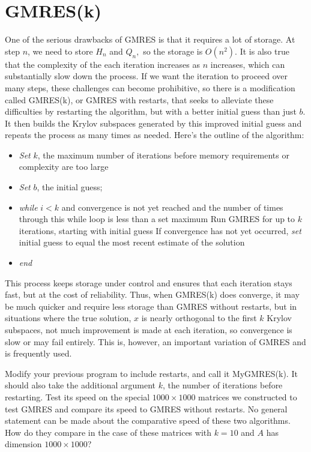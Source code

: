 \section*{GMRES(k)}
One of the serious drawbacks of GMRES is that it requires a lot of storage.
At step $n$, we need to store $H_n$ and $Q_n,$ so the storage is $O(n^2).$
It is also true that the complexity of the each iteration increases as $n$ increases, which can substantially slow down the process.
If we want the iteration to proceed over many steps, these challenges can become prohibitive, so there is a modification called GMRES(k), or GMRES with restarts, that seeks to alleviate these difficulties by restarting the algorithm, but with a better initial guess than just $b$.
It then builds the Krylov subspaces generated by this improved initial guess and repeats the process as many times as needed.
Here's the outline of the algorithm:
\begin{itemize}
\item \emph{Set} $k$, the maximum number of iterations before memory requirements or complexity are too large
\item \emph{Set} $b$, the initial guess;
\item \emph{while} $i<k$ and convergence is not yet reached and the number of times through this while loop is less than a set maximum
\subitem Run GMRES for up to $k$ iterations, starting with initial guess
\subitem If convergence has not yet occurred, \emph{set} initial guess to equal the most recent estimate of the solution
\item \emph{end} 
\end{itemize}

This process keeps storage under control and ensures that each iteration stays fast, but at the cost of reliability.
Thus, when GMRES(k) does converge, it may be much quicker and require less storage than GMRES without restarts, but in situations where the true solution, $x$ is nearly orthogonal to the first $k$ Krylov subspaces, not much improvement is made at each iteration, so convergence is slow or may fail entirely.
This is, however, an important variation of GMRES and is frequently used.

\begin{problem}
\label{prob:GMRES3}
Modify your previous program to include restarts, and call it MyGMRES(k).
It should also take the additional argument $k$, the number of iterations before restarting.
Test its speed on the special $1000\times 1000$ matrices we constructed to test GMRES and compare its speed to GMRES without restarts.
No general statement can be made about the comparative speed of these two algorithms.
How do they compare in the case of these matrices with $k=10$ and $A$ has dimension $1000\times 1000$?
\end{problem}

